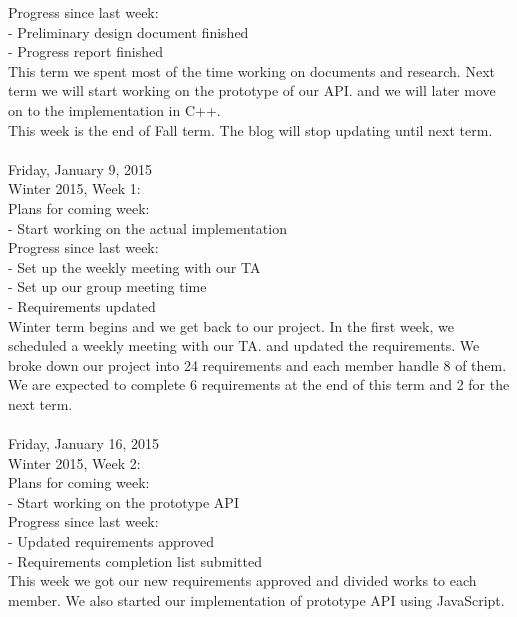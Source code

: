 {Progress since last week: \\
- Preliminary design document finished \\
- Progress report finished \\

This term we spent most of the time working on documents and research. Next term we will start working on the prototype of our API. and we will later move on to the implementation in C++. \\

This week is the end of Fall term. The blog will stop updating until next term. \\

\hrulefill \\
Friday, January 9, 2015 \\
Winter 2015, Week 1: \\

Plans for coming week: \\
- Start working on the actual implementation \\

Progress since last week: \\
- Set up the weekly meeting with our TA \\
- Set up our group meeting time \\
- Requirements updated \\

Winter term begins and we get back to our project. In the first week, we scheduled a weekly meeting with our TA. and updated the requirements. We broke down our project into 24 requirements and each member handle 8 of them. We are expected to complete 6 requirements at the end of this term and 2 for the next term. \\

\hrulefill \\
Friday, January 16, 2015 \\
Winter 2015, Week 2: \\

Plans for coming week: \\
- Start working on the prototype API \\

Progress since last week: \\
- Updated requirements approved \\
- Requirements completion list submitted \\

This week we got our new requirements approved and divided works to each member. We also started our implementation of prototype API using JavaScript. \\

}
